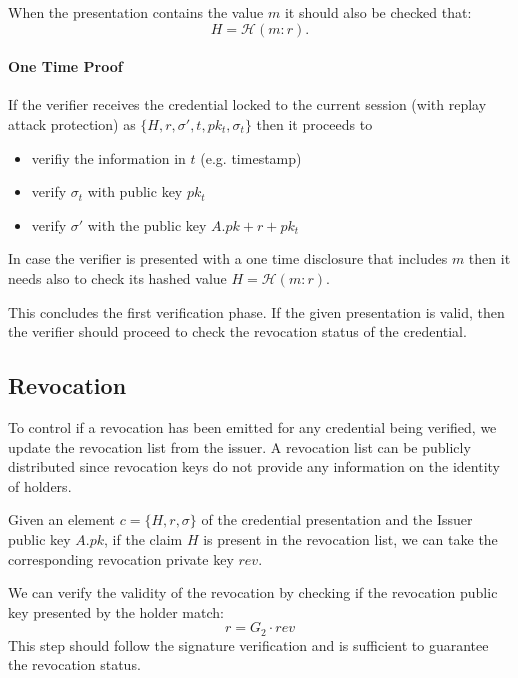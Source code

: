 When the presentation contains the value $m$ it should also be checked
that:
\begin{equation*}
    H = \mathcal{H}(m : r).
\end{equation*}


\paragraph{One Time Proof}

If the verifier receives the credential locked to the current session
(with replay attack protection) as $\{H, r, \sigma', t, pk_t,
\sigma_t\}$ then it proceeds to
\begin{itemize}
\item verifiy the information in $t$ (e.g. timestamp)
\item verify $\sigma_t$ with public key $pk_t$
\item verify $\sigma'$ with the public key $A.pk + r + pk_t$
	\end{itemize}

In case the verifier is presented with a one time disclosure that
includes $m$ then it needs also to check its hashed value $H =
\mathcal{H}(m : r)$.

This concludes the first verification phase. If the given presentation
is valid, then the verifier should proceed to check the revocation
status of the credential.

\subsection{Revocation}

To control if a revocation has been emitted for any credential being
verified, we update the revocation list from the issuer. A revocation
list can be publicly distributed since revocation keys do not provide
any information on the identity of holders.

Given an element $c = \{H, r, \sigma \}$ of the credential
presentation and the Issuer public key $A.pk$, if the claim $H$ is
present in the revocation list, we can take the corresponding
revocation private key $rev$.

We can verify the validity of the revocation by checking if the
revocation public key presented by the holder match:
\begin{equation*}
    r = G_2 \cdot rev
\end{equation*}
This step should follow the signature verification and is sufficient
to guarantee the revocation status.

